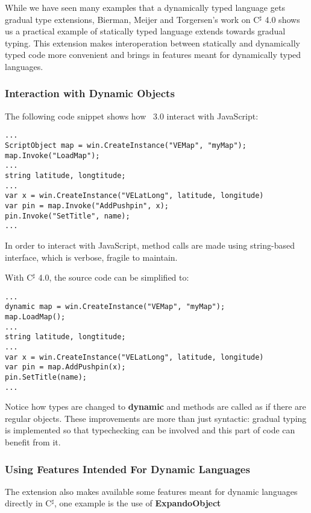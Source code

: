 While we have seen many examples that a dynamically typed language gets
gradual type extensions, Bierman, Meijer and Torgersen's work on
C$^\sharp$ 4.0\cite{meijer2004static} shows us a practical example of statically typed language
extends towards gradual typing.
This extension makes interoperation between statically and dynamically typed code
more convenient and brings in features meant for dynamically typed languages.

\subsubsection{Interaction with Dynamic Objects}

The following code snippet shows how \csharp\ 3.0 interact with JavaScript:

\begin{verbatim}
...
ScriptObject map = win.CreateInstance("VEMap", "myMap");
map.Invoke("LoadMap");
...
string latitude, longtitude;
...
var x = win.CreateInstance("VELatLong", latitude, longitude)
var pin = map.Invoke("AddPushpin", x);
pin.Invoke("SetTitle", name);
...
\end{verbatim}

In order to interact with JavaScript, method calls
are made using string-based interface, which is verbose, fragile to maintain.

With C$^\sharp$ 4.0, the source code can be simplified to:

\begin{verbatim}
...
dynamic map = win.CreateInstance("VEMap", "myMap");
map.LoadMap();
...
string latitude, longtitude;
...
var x = win.CreateInstance("VELatLong", latitude, longitude)
var pin = map.AddPushpin(x);
pin.SetTitle(name);
...
\end{verbatim}

Notice how types are changed to \textbf{dynamic} and methods are called
as if there are regular objects.
These improvements are more than just syntactic: gradual typing is implemented
so that typechecking can be involved and this part of code can benefit from it.

\subsubsection{Using Features Intended For Dynamic Languages}

The extension also makes available some features meant for dynamic languages
directly in C$^\sharp$, one example is the use of \textbf{ExpandoObject}

